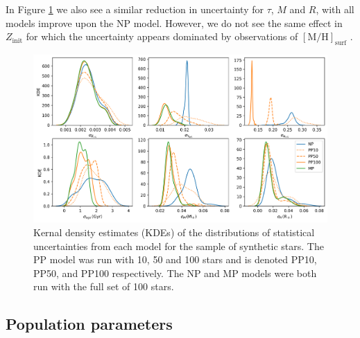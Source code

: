 \documentclass[a4paper,fleqn,usenatbib]{mnras}
\newcommand{\metallicity}{\ensuremath{[\mathrm{M}/\mathrm{H}]}}
\begin{document}
In Figure \ref{fig:shrinkage} we also see a similar reduction in uncertainty for $\tau$, $M$ and $R$, with all models improve upon the NP model. However, we do not see the same effect in $Z_\mathrm{init}$ for which the uncertainty appears dominated by observations of $\metallicity_\mathrm{surf}$ .

\begin{figure}
    \centering
    \includegraphics[width=\textwidth]{figures/shrinkage.png}
    \caption{Kernal density estimates (KDEs) of the distributions of statistical uncertainties from each model for the sample of synthetic stars. The PP model was run with 10, 50 and 100 stars and is denoted PP10, PP50, and PP100 respectively. The NP and MP models were both run with the full set of 100 stars.}
    \label{fig:shrinkage}
\end{figure}

\subsection{Population parameters}


\end{document}
